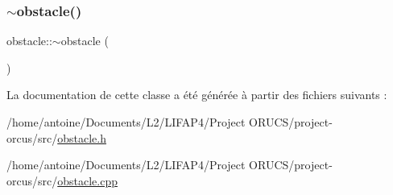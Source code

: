 \mbox{\label{classobstacle_a80f971014a4e7ff96e5a0ab48f04833a}} 
\subsubsection{\texorpdfstring{$\sim$obstacle()}{~obstacle()}}
{\footnotesize\ttfamily obstacle\+::$\sim$obstacle (\begin{DoxyParamCaption}{ }\end{DoxyParamCaption})}



La documentation de cette classe a été générée à partir des fichiers suivants \+:\begin{DoxyCompactItemize}
\item 
/home/antoine/\+Documents/\+L2/\+L\+I\+F\+A\+P4/\+Project O\+R\+U\+C\+S/project-\/orcus/src/\hyperlink{obstacle_8h}{obstacle.\+h}\item 
/home/antoine/\+Documents/\+L2/\+L\+I\+F\+A\+P4/\+Project O\+R\+U\+C\+S/project-\/orcus/src/\hyperlink{obstacle_8cpp}{obstacle.\+cpp}\end{DoxyCompactItemize}
